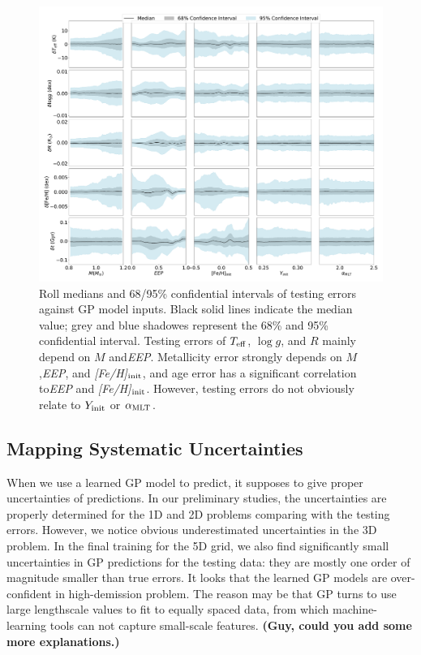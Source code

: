 \begin{figure}
	\includegraphics[width=2.0\columnwidth]{ 5d-testing_vs_inputs.pdf}
    \caption{ Roll medians and 68/95\% confidential intervals of testing errors against GP model  inputs. Black solid lines indicate the median value; grey and blue shadowes represent the 68\% and 95\% confidential interval. Testing errors of $T_{\rm eff}$, $\log g$, and $R$ mainly depend on $M$ and{\it EEP}. Metallicity error strongly depends on $M$,{\it EEP}, and {\it [Fe/H]}$_{\rm init}$, and age error has a significant correlation to{\it EEP} and {\it [Fe/H]}$_{\rm init}$. However, testing errors do not obviously relate to $Y_{\rm init}$ or $\alpha_{\rm MLT}$. } 
  \label{fig:5d_test_vs_input}
\end{figure}
%

\subsection{Mapping Systematic Uncertainties}\label{sec:sys}

When we use a learned GP model to predict, it supposes to give proper uncertainties of predictions. In our preliminary studies, the uncertainties are properly determined for the 1D and 2D problems comparing with the testing errors. However, we notice obvious underestimated uncertainties in the 3D problem. In the final training for the 5D grid, we also find significantly small uncertainties in GP predictions for the testing data: they are mostly one order of magnitude smaller than true errors. It looks that the learned GP models are over-confident in high-demission problem. The reason may be that GP turns to use large lengthscale values to fit to equally spaced data, from which machine-learning tools can not capture small-scale features. {\bf (Guy, could you add some more explanations.)} 
 
